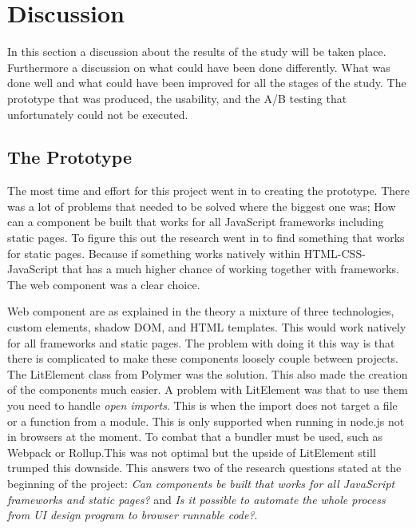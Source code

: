 \section{Discussion}

In this section a discussion about the results of the study will be taken place. Furthermore a discussion on what could have been done differently. What was done well and what could have been improved for all the stages of the study. The prototype that was produced, the usability, and the A/B testing that unfortunately could not be executed.


\subsection{The Prototype}%
\label{sub:The Prototype}
The most time and effort for this project went in to creating the prototype. 
There was a lot of problems that needed to be solved where the biggest one was; How can a component be built that works for all JavaScript frameworks including static pages. To figure this out the research went in to find something that works for static pages. Because if something works natively within HTML-CSS-JavaScript that has a much higher chance of working together with frameworks. The web component was a clear choice.

Web component are as explained in the theory a mixture of three technologies, custom elements, shadow DOM, and HTML templates. This would work natively for all frameworks and static pages. The problem with doing it this way is that there is complicated to make these components loosely couple between projects. The LitElement class from Polymer was the solution. This also made the creation of the components much easier. A problem with LitElement was that to use them you need to handle \textit{open imports}. This is when the import does not target a file or a function from a module. This is only supported when running in node.js not in browsers at the moment. To combat that a bundler must be used, such as Webpack or Rollup.This was not optimal but the upside of LitElement still trumped this downside. This answers two of the research questions stated at the beginning of the project: \textit{Can components be built that works for all JavaScript frameworks and static pages?} and \textit{Is it possible to automate the whole process from UI design program to browser runnable code?}.

